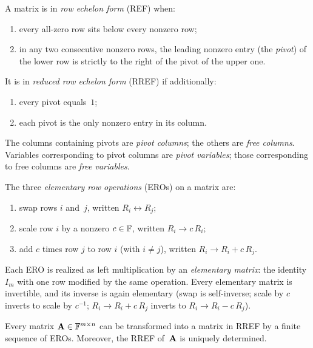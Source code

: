 \begin{definition}
\label{def:gauss-ref}
A matrix is in \emph{row echelon form} (REF) when:
\begin{enumerate}[label=(\alph*)]
  \item every all-zero row sits below every nonzero row;
  \item in any two consecutive nonzero rows, the leading nonzero entry
        (the \emph{pivot}) of the lower row is strictly to the right of
        the pivot of the upper one.
\end{enumerate}
It is in \emph{reduced row echelon form} (RREF) if additionally:
\begin{enumerate}[label=(\alph*),resume]
  \item every pivot equals~$1$;
  \item each pivot is the only nonzero entry in its column.
\end{enumerate}
The columns containing pivots are \emph{pivot columns}; the others are
\emph{free columns}. Variables corresponding to pivot columns are
\emph{pivot variables}; those corresponding to free columns are
\emph{free variables}.
\end{definition}

\begin{definition}
\label{def:gauss-ero}
The three \emph{elementary row operations} (EROs) on a matrix are:
\begin{enumerate}[label=(\Roman*)]
  \item swap rows $i$ and~$j$, written $R_i \leftrightarrow R_j$;
  \item scale row $i$ by a nonzero $c \in \mathbb{F}$, written $R_i \to c\,R_i$;
  \item add $c$ times row $j$ to row $i$ (with $i \neq j$), written
        $R_i \to R_i + c\,R_j$.
\end{enumerate}
Each ERO is realized as left multiplication by an \emph{elementary matrix}:
the identity $I_m$ with one row modified by the same operation. Every
elementary matrix is invertible, and its inverse is again elementary
(swap is self-inverse; scale by $c$ inverts to scale by $c^{-1}$;
$R_i \to R_i + c\,R_j$ inverts to $R_i \to R_i - c\,R_j$).
\end{definition}

\begin{theorem}[Gauss]
\label{thm:gauss-rref}
Every matrix $\mathbf{A} \in \mathbb{F}^{m \times n}$ can be transformed into a
matrix in RREF by a finite sequence of EROs. Moreover, the RREF
of~$\mathbf{A}$ is uniquely determined.
\end{theorem}

